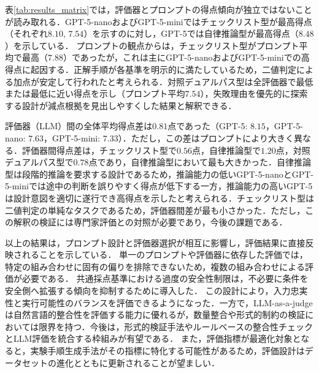 \documentclass[twocolumn]{jarticle}
\begin{document}

表\ref{tab:results_matrix}では，評価器とプロンプトの得点傾向が独立ではないことが読み取れる．GPT-5-nanoおよびGPT-5-miniではチェックリスト型が最高得点（それぞれ$8.10$, $7.54$）を示すのに対し，GPT-5では自律推論型が最高得点（$8.48$）を示している．
プロンプトの観点からは，チェックリスト型がプロンプト平均で最高（$7.88$）であったが，これは主にGPT-5-nanoおよびGPT-5-miniでの高得点に起因する．正解手順が各基準を明示的に満たしているため，二値判定による加点が安定して行われたと考えられる．対照デュアルパス型は全評価器で最低または最低に近い得点を示し（プロンプト平均$7.54$），失敗理由を優先的に探索する設計が減点根拠を見出しやすくした結果と解釈できる．

評価器（LLM）間の全体平均得点差は$0.81$点であった（GPT-5: $8.15$，GPT-5-nano: $7.63$，GPT-5-mini: $7.33$）．ただし，この差はプロンプトにより大きく異なる．評価器間得点差は，チェックリスト型で$0.56$点，自律推論型で$1.20$点，対照デュアルパス型で$0.78$点であり，自律推論型において最も大きかった．自律推論型は段階的推論を要求する設計であるため，推論能力の低いGPT-5-nanoとGPT-5-miniでは途中の判断を誤りやすく得点が低下する一方，推論能力の高いGPT-5は設計意図を適切に遂行でき高得点を示したと考えられる．チェックリスト型は二値判定の単純なタスクであるため，評価器間差が最も小さかった．ただし，この解釈の検証には専門家評価との対照が必要であり，今後の課題である．

以上の結果は，プロンプト設計と評価器選択が相互に影響し，評価結果に直接反映されることを示している．
単一のプロンプトや評価器に依存した評価では，特定の組み合わせに固有の偏りを排除できないため，複数の組み合わせによる評価が必要である．
共通採点基準における過度の安全性制限は，不必要に条件を安全側へ拡張する傾向を抑制するために導入した．
この設計により，入力忠実性と実行可能性のバランスを評価できるようになった．一方で，LLM-as-a-judgeは自然言語的整合性を評価する能力に優れるが，数量整合や形式的制約の検証においては限界を持つ．今後は，形式的検証手法やルールベースの整合性チェックとLLM評価を統合する枠組みが有望である．
また，評価指標が最適化対象となると，実験手順生成手法がその指標に特化する可能性があるため，評価設計はデータセットの進化とともに更新されることが望ましい．
\end{document}
